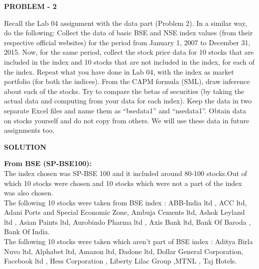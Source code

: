 \documentclass{article}
\begin{document}
\begin{center}
\textbf{PROBLEM - 2}
\end{center}
Recall the Lab 04 assignment with the data part (Problem 2). In a similar way, do the following: Collect the
data of basic BSE and NSE index values (from their respective official websites) for the period from January
1, 2007 to December 31, 2015. Now, for the same period, collect the stock price data for 10 stocks that are
included in the index and 10 stocks that are not included in the index, for each of the index. Repeat what you
have done in Lab 04, with the index as market portfolio (for both the indices). From the CAPM formula (SML),
draw inference about each of the stocks. Try to compare the betas of securities (by taking the actual data and
computing from your data for each index).
Keep the data in two separate Excel files and name them as “bsedata1” and “nsedata1”. Obtain data on stocks
yourself and do not copy from others. We will use these data in future assignments too.

\begin{center}
\textbf{SOLUTION}
\end{center}

\textbf{From BSE (SP-BSE100):}\\
The index chosen was SP-BSE 100 and it included around 80-100 stocks.Out of which 10 stocks were chosen and 10 stocks which were not a part of the index was also chosen.\\
The following 10 stocks were taken from BSE index : ABB-India ltd , ACC ltd, Adani Ports and Special Economic Zone, Ambuja Cements ltd, Ashok Leyland ltd , Asian Paints ltd, Aurobindo Pharma ltd , Axis Bank ltd, Bank Of Baroda , Bank Of India.\\
The following 10 stocks were taken which aren't part of BSE index : Aditya Birla Nuvo ltd, Alphabet ltd, Amazon ltd, Dadone ltd, Dollar General Corporation, Facebook ltd , Hess Corporation , Liberty Lilac Group ,MTNL , Taj Hotels.\\\\
\end{document}
